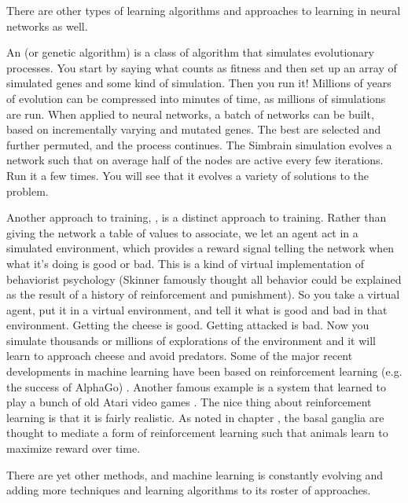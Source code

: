 There are other types of learning algorithms and approaches to learning in neural networks as well.

An  (or genetic algorithm) is a class of algorithm that simulates evolutionary processes. You start by saying what counts as fitness and then set up an array of simulated genes and some kind of simulation. Then you run it!  Millions of years of evolution can be compressed into minutes of time, as millions of simulations are run. When applied to neural networks, a batch of networks can be built, based on incrementally varying and mutated genes. The best are selected and further permuted, and the process continues. The Simbrain simulation  evolves a network such that on average half of the nodes are active every few iterations. Run it a few times. You will see that it evolves a variety of solutions to the problem.

Another approach to training, , is a distinct approach to training. Rather than giving the network a table of values to associate, we let an agent act in a simulated environment, which provides a reward signal telling the network when what it's doing is good or bad. This is a kind of virtual implementation of behaviorist psychology (Skinner famously thought all behavior could be explained as the result of a history of reinforcement and punishment). So you take a virtual agent, put it in a virtual environment, and tell it what  is good and bad in that environment. Getting the cheese is good. Getting attacked is bad. Now you simulate thousands or millions of explorations of the environment and it will learn to approach cheese and avoid predators. Some of the major recent developments in machine learning have been based on reinforcement learning (e.g. the success of AlphaGo) \cite{silver2016mastering}. Another famous example is a system that learned to play a bunch of old Atari video games \cite{mnih2013playing}. The nice thing about reinforcement learning is that it is fairly realistic. As noted in chapter , the basal ganglia are thought to mediate a form of reinforcement learning such that animals learn to maximize reward over time. 

There are yet other methods, and machine learning is constantly evolving and adding more techniques and learning algorithms to its roster of approaches. 

